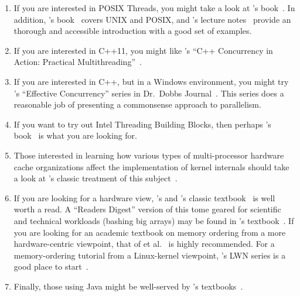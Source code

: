 \begin{enumerate}
\item	If you are interested in POSIX Threads, you might take
	a look at 's book~\cite{Butenhof1997pthreads}.
	In addition,
	's book~\cite{WRichardStevens1992,WRichardStevens2013}
	covers UNIX and POSIX, and 's lecture
	notes~\cite{StewartWeiss2013UNIX} provide an
	thorough and accessible introduction with a good set of
	examples.
\item	If you are interested in C++11, you might like
	's ``C++ Concurrency in Action:
	Practical Multithreading''~\cite{AnthonyWilliams2012,AnthonyWilliams2019}.
\item	If you are interested in C++, but in a Windows environment,
	you might try 's ``Effective Concurrency''
	series in
	Dr.~Dobbs Journal~\cite{HerbSutter2008EffectiveConcurrency}.
	This series does a reasonable job of presenting a
	commonsense approach to parallelism.
\item	If you want to try out Intel Threading Building Blocks,
	then perhaps 's book~\cite{Reinders2007Textbook}
	is what you are looking for.
\item	Those interested in learning how various types of multi-processor
	hardware
	cache organizations affect the implementation of kernel
	internals should take a look at 's classic
	treatment of this subject~\cite{Schimmel:1994:USM:175689}.
\item	If you are looking for a hardware view, 's and
	's classic
	textbook~\cite{Hennessy2017,Hennessy2011} is well worth a read.
	A ``Readers Digest'' version of this tome geared for scientific
	and technical workloads (bashing big arrays) may be found in
	's
	textbook~\cite{AndrewChien2022ComputerArchitectureScientists}.
	If you are looking for an academic textbook on memory ordering from
	a more hardware-centric viewpoint,
	that of  et al.~\cite{DanielJSorin2011MemModel,%
	VijayNagarajan2020MemModel}
	is highly recommended.
	For a memory-ordering tutorial from a Linux-kernel viewpoint,
	's LWN series is a good place to
	start~\cite{PaoloBonzini2021lockless1,PaoloBonzini2021lockless2,PaoloBonzini2021lockless3,PaoloBonzini2021lockless4,PaoloBonzini2021lockless5,PaoloBonzini2021lockless6}.
\item	Finally, those using Java might be well-served by 's
	textbooks~\cite{DougLea1997Textbook,Goetz2007Textbook}.
\end{enumerate}

